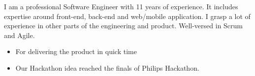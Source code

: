 

I am a professional Software Engineer
with 11 years of experience. It includes
expertise around front-end, back-end and web/mobile application. I grasp a lot of experience
in other parts of the engineering and product. Well-versed in Scrum and Agile.
\smallskip







\smallskip
{}

 









     	 \begin{itemize}
    \item	{For delivering the product in quick time} 
\end{itemize}
     
     	\smallskip
         \begin{itemize}
    \item{Our Hackathon idea reached the finals of Philips Hackathon}. 
\end{itemize}    	



